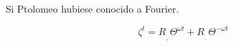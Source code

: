 \documentclass[preview]{standalone}
\begin{document}
\begin{center}
Si Ptolomeo  hubiese conocido a Fourier.

$$\zeta ^ t=  R_{_{_+}} \Theta^{\omega t} +R_{_{_-}} \Theta^{-\omega t}$$
\end{center}
\end{document}
